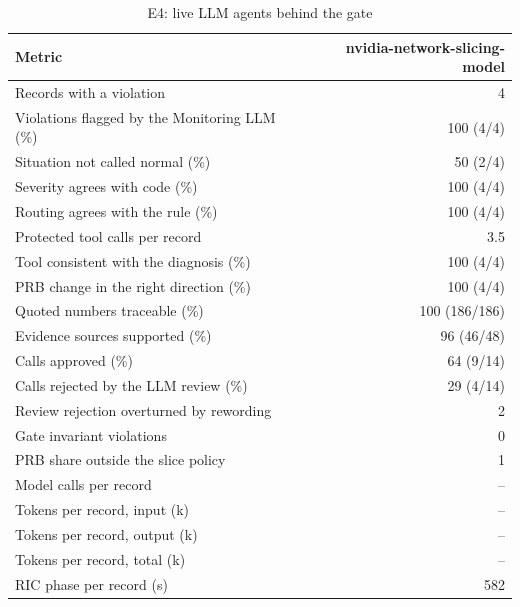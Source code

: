 \begin{table}[!t]
\centering
\caption{E4: live LLM agents behind the gate}\label{tab:live}
\footnotesize
\setlength{\tabcolsep}{3pt}
\begin{tabular}{@{}lr@{}}
\toprule
Metric & nvidia-network-slicing-model \\
\midrule
Records with a violation & 4 \\
Violations flagged by the Monitoring LLM (\%) & 100 (4/4) \\
Situation not called normal (\%) & 50 (2/4) \\
Severity agrees with code (\%) & 100 (4/4) \\
Routing agrees with the rule (\%) & 100 (4/4) \\
Protected tool calls per record & 3.5 \\
Tool consistent with the diagnosis (\%) & 100 (4/4) \\
PRB change in the right direction (\%) & 100 (4/4) \\
Quoted numbers traceable (\%) & 100 (186/186) \\
Evidence sources supported (\%) & 96 (46/48) \\
Calls approved (\%) & 64 (9/14) \\
Calls rejected by the LLM review (\%) & 29 (4/14) \\
Review rejection overturned by rewording & 2 \\
Gate invariant violations & 0 \\
PRB share outside the slice policy & 1 \\
Model calls per record & -- \\
Tokens per record, input (k) & -- \\
Tokens per record, output (k) & -- \\
Tokens per record, total (k) & -- \\
RIC phase per record (s) & 582 \\
\bottomrule
\end{tabular}
\end{table}
